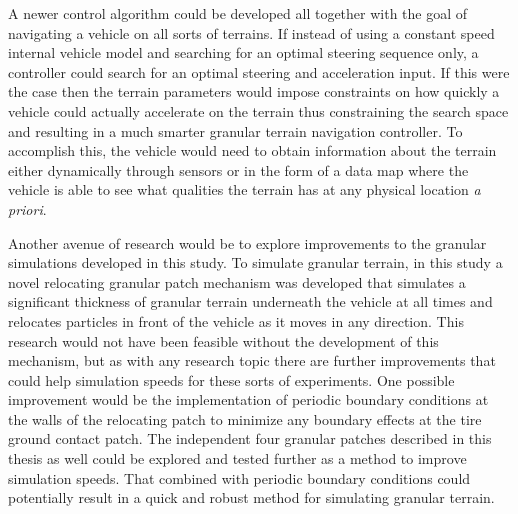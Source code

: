 \documentclass[12pt,onecolumn]{report}
\begin{document}
A newer control algorithm could be developed all together with the goal of navigating a vehicle on all sorts of terrains. If instead of using a constant speed internal vehicle model and searching for an optimal steering sequence only, a controller could search for an optimal steering and acceleration input. If this were the case then the terrain parameters would impose constraints on how quickly a vehicle could actually accelerate on the terrain thus constraining the search space and resulting in a much smarter granular terrain navigation controller. To accomplish this, the vehicle would need to obtain information about the terrain either dynamically through sensors or in the form of a data map where the vehicle is able to see what qualities the terrain has at any physical location\textit{ a priori}.

Another avenue of research would be to explore improvements to the granular simulations developed in this study. To simulate granular terrain, in this study a novel relocating granular patch mechanism was developed that simulates a significant thickness of granular terrain underneath the vehicle at all times and relocates particles in front of the vehicle as it moves in any direction. This research would not have been feasible without the development of this mechanism, but as with any research topic there are further improvements that could help simulation speeds for these sorts of experiments. One possible improvement would be the implementation of periodic boundary conditions at the walls of the relocating patch to minimize any boundary effects at the tire ground contact patch. The independent four granular patches described in this thesis as well could be explored and tested further as a method to improve simulation speeds. That combined with periodic boundary conditions could potentially result in a quick and robust method for simulating granular terrain. 
\end{document}
